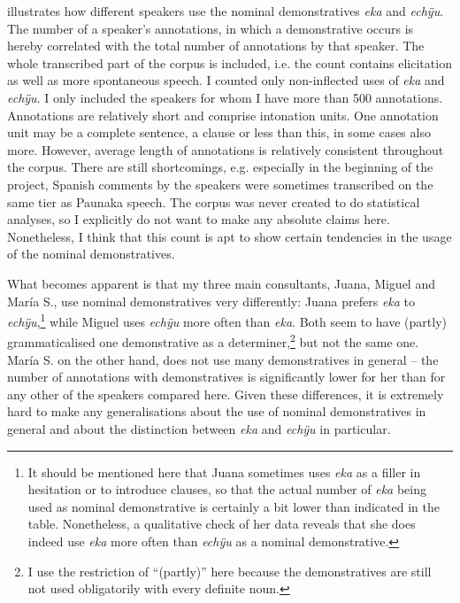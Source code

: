  illustrates how different speakers use the nominal demonstratives \textit{eka} and \textit{echÿu}. The number of a speaker’s annotations, in which a demonstrative occurs is hereby correlated with the total number of annotations by that speaker. The whole transcribed part of the corpus is included, i.e. the count contains elicitation as well as more spontaneous speech. I counted only non-inflected uses of \textit{eka} and \textit{echÿu}. I only included the speakers for whom I have more than 500 annotations. Annotations are relatively short and comprise intonation units. One annotation unit may be a complete sentence, a clause or less than this, in some cases also more. However, average length of annotations is relatively consistent throughout the corpus. There are still shortcomings, e.g. especially in the beginning of the project, Spanish comments by the speakers were sometimes transcribed on the same tier as Paunaka speech. The corpus was never created to do statistical analyses, so I explicitly do not want to make any absolute claims here. Nonetheless, I think that this count is apt to show certain tendencies in the usage of the nominal demonstratives.


What becomes apparent is that my three main consultants, Juana, Miguel and María S., use nominal demonstratives very differently: Juana prefers \textit{eka} to \textit{echÿu},\footnote{It should be mentioned here that Juana sometimes uses \textit{eka} as a filler in hesitation or to introduce clauses, so that the actual number of \textit{eka} being used as nominal demonstrative is certainly a bit lower than indicated in the table. Nonetheless, a qualitative check of her data reveals that she does indeed use \textit{eka} more often than \textit{echÿu} as a nominal demonstrative.} while Miguel uses \textit{echÿu} more often than \textit{eka}. Both seem to have (partly) grammaticalised one demonstrative as a determiner,\footnote{I use the restriction of “(partly)” here because the demonstratives are still not used obligatorily with every definite noun.} but not the same one. María S. on the other hand, does not use many demonstratives in general – the number of annotations with demonstratives is significantly lower for her than for any other of the speakers compared here. Given these differences, it is extremely hard to make any generalisations about the use of nominal demonstratives in general and about the distinction between \textit{eka} and \textit{echÿu} in particular. 

